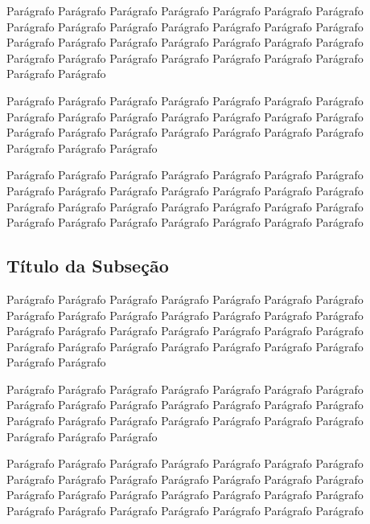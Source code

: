 Parágrafo Parágrafo Parágrafo Parágrafo Parágrafo Parágrafo Parágrafo Parágrafo Parágrafo Parágrafo Parágrafo Parágrafo Parágrafo Parágrafo Parágrafo Parágrafo Parágrafo Parágrafo Parágrafo Parágrafo Parágrafo Parágrafo Parágrafo Parágrafo Parágrafo Parágrafo Parágrafo Parágrafo Parágrafo Parágrafo 

Parágrafo Parágrafo Parágrafo Parágrafo Parágrafo Parágrafo Parágrafo Parágrafo Parágrafo Parágrafo Parágrafo Parágrafo Parágrafo Parágrafo Parágrafo Parágrafo Parágrafo Parágrafo Parágrafo Parágrafo Parágrafo Parágrafo Parágrafo Parágrafo 

Parágrafo Parágrafo Parágrafo Parágrafo Parágrafo Parágrafo Parágrafo Parágrafo Parágrafo Parágrafo Parágrafo Parágrafo Parágrafo Parágrafo Parágrafo Parágrafo Parágrafo Parágrafo Parágrafo Parágrafo Parágrafo Parágrafo Parágrafo Parágrafo Parágrafo Parágrafo Parágrafo Parágrafo

\subsection{Título da Subseção}

Parágrafo Parágrafo Parágrafo Parágrafo Parágrafo Parágrafo Parágrafo Parágrafo Parágrafo Parágrafo Parágrafo Parágrafo Parágrafo Parágrafo Parágrafo Parágrafo Parágrafo Parágrafo Parágrafo Parágrafo Parágrafo Parágrafo Parágrafo Parágrafo Parágrafo Parágrafo Parágrafo Parágrafo Parágrafo Parágrafo 

Parágrafo Parágrafo Parágrafo Parágrafo Parágrafo Parágrafo Parágrafo Parágrafo Parágrafo Parágrafo Parágrafo Parágrafo Parágrafo Parágrafo Parágrafo Parágrafo Parágrafo Parágrafo Parágrafo Parágrafo Parágrafo Parágrafo Parágrafo Parágrafo 

Parágrafo Parágrafo Parágrafo Parágrafo Parágrafo Parágrafo Parágrafo Parágrafo Parágrafo Parágrafo Parágrafo Parágrafo Parágrafo Parágrafo Parágrafo Parágrafo Parágrafo Parágrafo Parágrafo Parágrafo Parágrafo Parágrafo Parágrafo Parágrafo Parágrafo Parágrafo Parágrafo Parágrafo
